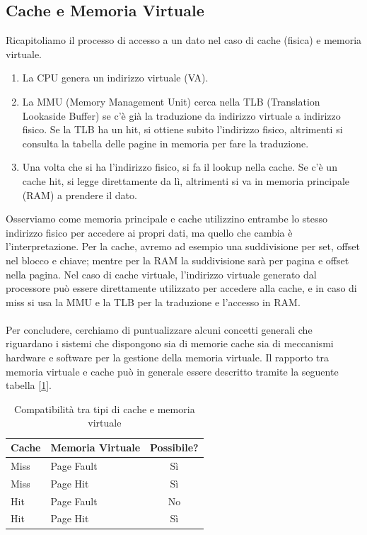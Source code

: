 \subsection{Cache e Memoria Virtuale}
Ricapitoliamo il processo di accesso a un dato nel caso di cache (fisica) e memoria virtuale.
\begin{enumerate}
	\item La CPU genera un indirizzo virtuale (VA).
	\item La MMU (Memory Management Unit) cerca nella TLB (Translation Lookaside Buffer) se c’è già la traduzione da indirizzo virtuale a indirizzo fisico. Se la TLB ha un hit, si ottiene subito l’indirizzo fisico, altrimenti si consulta la tabella delle pagine in memoria per fare la traduzione.
	\item Una volta che si ha l’indirizzo fisico, si fa il lookup nella cache. Se c’è un cache hit, si legge direttamente da lì, altrimenti si va in memoria principale (RAM) a prendere il dato.
\end{enumerate}
Osserviamo come memoria principale e cache utilizzino entrambe lo stesso indirizzo fisico per accedere ai propri dati, ma quello che cambia è l'interpretazione. Per la cache, avremo ad esempio una suddivisione per set, offset nel blocco e chiave; mentre per la RAM la suddivisione sarà per pagina e offset nella pagina. Nel caso di cache virtuale, l'indirizzo virtuale generato dal processore può essere direttamente utilizzato per accedere alla cache, e in caso di miss si usa la MMU e la TLB per la traduzione e l'accesso in RAM. 
\\
\\
Per concludere, cerchiamo di puntualizzare alcuni concetti generali che riguardano i sistemi che dispongono sia di memorie cache sia di meccanismi hardware e software per la gestione della memoria virtuale.
Il rapporto tra memoria virtuale e cache può in generale essere descritto tramite la seguente tabella [\ref{tab:cases_cache}].
\begin{table}[!h]
\centering
\begin{tabular}{|l|l|c|}
\hline
\textbf{Cache} & \textbf{Memoria Virtuale} & \textbf{Possibile?} \\
\hline
Miss & Page Fault & Sì \\
\hline
Miss & Page Hit & Sì \\
\hline
Hit & Page Fault & No \\
\hline
Hit & Page Hit & Sì \\
\hline
\end{tabular}
\caption{Compatibilità tra tipi di cache e memoria virtuale}
\label{tab:cases_cache}
\end{table}

